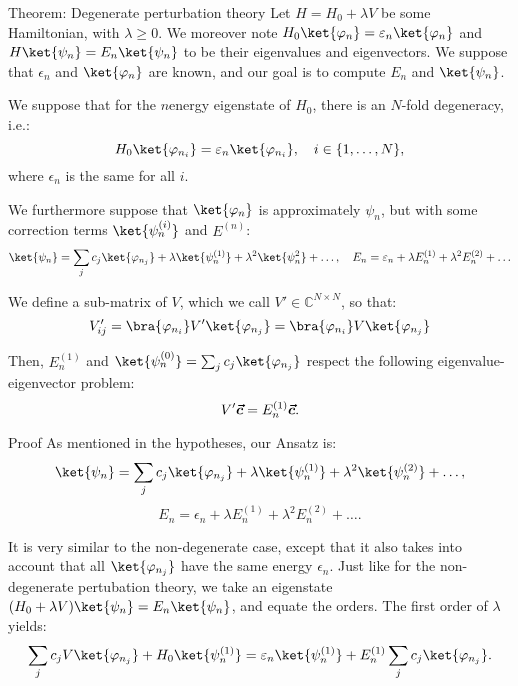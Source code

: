 \documentclass[a4paper]{article}
\begin{document}
\begin{parag}{Theorem: Degenerate perturbation theory}
    Let $H = H_0 + \lambda V$ be some Hamiltonian, with $\lambda \geq 0$. We moreover note $H_0 \ket{\phi_n} = \epsilon_n \ket{\phi_n}$ and $H \ket{\psi_n} = E_n \ket{\psi_n}$ to be their eigenvalues and eigenvectors. We suppose that $\epsilon_n$ and $\ket{\phi_n}$ are known, and our goal is to compute $E_n$ and $\ket{\psi_n}$.

    We suppose that for the $n$\Th energy eigenstate of $H_0$, there is an $N$-fold degeneracy, i.e.: 
    \[H_0 \ket{\phi_{n_i}} = \epsilon_n \ket{\phi_{n_i}}, \mathspace i \in \left\{1, \ldots, N\right\},\]
    where $\epsilon_n$ is the same for all $i$.

    We furthermore suppose that $\ket{\phi_n}$ is approximately $\psi_n$, but with some correction terms $\ket{\psi_n^{\left(i\right)}}$ and $E^{\left(n\right)}$:
    \[\ket{\psi_n} =  \sum_{j} c_j \ket{\phi_{n_j}} + \lambda \ket{\psi_n^{\left(1\right)}} + \lambda^2 \ket{\psi_n^2} + \ldots, \mathspace E_n = \epsilon_n + \lambda E_n^{\left(1\right)} + \lambda^2 E_n^{\left(2\right)} + \ldots\]
    
    We define a sub-matrix of $V$, which we call $V' \in \mathbb{C}^{N \times N}$, so that: 
    \[V_{ij}' = \bra{\phi_{n_i}} V' \ket{\phi_{n_j}} = \bra{\phi_{n_i}} V \ket{\phi_{n_j}}\]

    Then, $E_n^{\left(1\right)}$ and $\ket{\psi_n^{\left(0\right)}} = \sum_{j} c_j \ket{\phi_{n_j}}$ respect the following eigenvalue-eigenvector problem: 
    \[V' \bvec{c} = E_n^{\left(1\right)} \bvec{c}.\]
    
    \begin{subparag}{Proof}
        As mentioned in the hypotheses, our Ansatz is:
        \[\ket{\psi_n} = \sum_{j} c_j \ket{\phi_{n_j}} + \lambda \ket{\psi_n^{\left(1\right)}} + \lambda^2 \ket{\psi_n^{\left(2\right)}} + \ldots,\]
        \[E_n = \epsilon_n + \lambda E_n^{\left(1\right)} + \lambda^2 E_n^{\left(2\right)} + \ldots.\]

        It is very similar to the non-degenerate case, except that it also takes into account that all $\ket{\phi_{n_j}}$ have the same energy $\epsilon_n$. Just like for the non-degenerate pertubation theory, we take an eigenstate $\left(H_0 + \lambda V\right) \ket{\psi_n} = E_n \ket{\psi_n}$, and equate the orders. The first order of $\lambda$ yields: 
        \[\sum_{j} c_j V \ket{\phi_{n_j}} + H_0 \ket{\psi_n^{\left(1\right)}} = \epsilon_n \ket{\psi_n^{\left(1\right)}} + E_n^{\left(1\right)} \sum_{j} c_j \ket{\phi_{n_j}}.\]


\end{subparag}
\end{parag}
\end{document}

